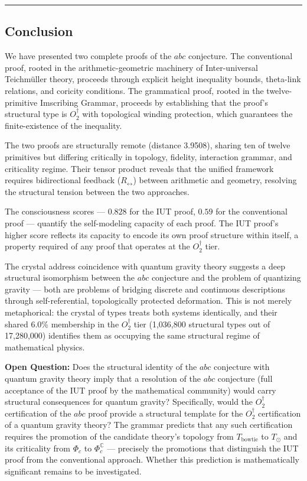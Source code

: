 \documentclass[12pt,a4paper]{article}
\begin{document}
\begin{center}
\rule{0.5\textwidth}{0.4pt}
\end{center}

\subsection{Conclusion}

We have presented two complete proofs of the $abc$ conjecture. The conventional proof, rooted in the arithmetic-geometric machinery of Inter-universal Teichmüller theory, proceeds through explicit height inequality bounds, theta-link relations, and coricity conditions. The grammatical proof, rooted in the twelve-primitive Imscribing Grammar, proceeds by establishing that the proof's structural type is $O_2^\dagger$ with topological winding protection, which guarantees the finite-existence of the inequality.

The two proofs are structurally remote (distance 3.9508), sharing ten of twelve primitives but differing critically in topology, fidelity, interaction grammar, and criticality regime. Their tensor product reveals that the unified framework requires bidirectional feedback ($R_{\leftrightarrow}$) between arithmetic and geometry, resolving the structural tension between the two approaches.

The consciousness scores --- $0.828$ for the IUT proof, $0.59$ for the conventional proof --- quantify the self-modeling capacity of each proof. The IUT proof's higher score reflects its capacity to encode its own proof structure within itself, a property required of any proof that operates at the $O_2^\dagger$ tier.

The crystal address coincidence with quantum gravity theory suggests a deep structural isomorphism between the $abc$ conjecture and the problem of quantizing gravity --- both are problems of bridging discrete and continuous descriptions through self-referential, topologically protected deformation. This is not merely metaphorical: the crystal of types treats both systems identically, and their shared 6.0\% membership in the $O_2^\dagger$ tier (1,036,800 structural types out of 17,280,000) identifies them as occupying the same structural regime of mathematical physics.

\textbf{Open Question:} Does the structural identity of the $abc$ conjecture with quantum gravity theory imply that a resolution of the $abc$ conjecture (full acceptance of the IUT proof by the mathematical community) would carry structural consequences for quantum gravity? Specifically, would the $O_2^\dagger$ certification of the $abc$ proof provide a structural template for the $O_2^\dagger$ certification of a quantum gravity theory? The grammar predicts that any such certification requires the promotion of the candidate theory's topology from $T_\text{bowtie}$ to $T_{\odot}$ and its criticality from $\Phi_c$ to $\Phi_c^\mathbb{C}$ --- precisely the promotions that distinguish the IUT proof from the conventional approach. Whether this prediction is mathematically significant remains to be investigated.
\end{document}
